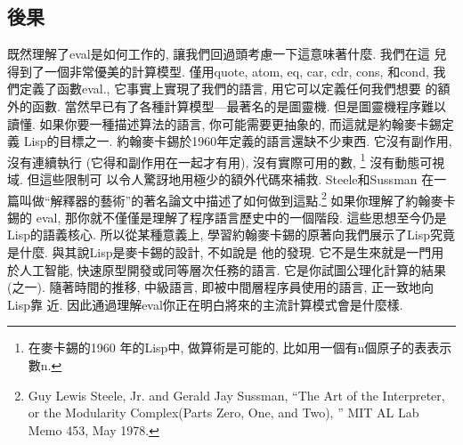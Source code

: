 \documentclass[12pt]{article}
\begin{document}
\begin{CJK}{UTF8}{bsmi}
\section{後果} 
既然理解了eval是如何工作的, 
讓我們回過頭考慮一下這意味著什麼. 
我們在這 
兒得到了一個非常優美的計算模型. 
僅用quote, atom, eq, car, cdr, cons, 和cond, 
我們定義了函數eval., 它事實上實現了我們的語言, 用它可以定義任何我們想要 
的額外的函數. 
當然早已有了各種計算模型---最著名的是圖靈機. 
但是圖靈機程序難以讀懂. 
如果你要一種描述算法的語言, 
你可能需要更抽象的, 
而這就是約翰麥卡錫定義 
Lisp的目標之一. 
約翰麥卡錫於1960年定義的語言還缺不少東西. 
它沒有副作用, 
沒有連續執行 
(它得和副作用在一起才有用), 
沒有實際可用的數, \footnote{在麥卡錫的1960 
年的Lisp中, 
做算術是可能的, 
比如用一個有n個原子的表表示數n.} 
沒有動態可視域. 
但這些限制可 
以令人驚訝地用極少的額外代碼來補救. 
Steele和Sussman
在一篇叫做``解釋器的藝術''的著名論文中描述了如何做到這點.\footnote{Guy 
Lewis Steele, Jr.  and Gerald Jay Sussman, ``The Art of the Interpreter, 
or the Modularity Complex(Parts Zero, One, and Two), '' 
MIT AL Lab Memo 453, May 1978.} 
如果你理解了約翰麥卡錫的 eval, 
那你就不僅僅是理解了程序語言歷史中的一個階段. 
這些思想至今仍是Lisp的語義核心. 
所以從某種意義上, 
學習約翰麥卡錫的原著向我們展示了Lisp究竟是什麼. 
與其說Lisp是麥卡錫的設計, 不如說是 
他的發現. 
它不是生來就是一門用於人工智能, 
快速原型開發或同等層次任務的語言. 
它是你試圖公理化計算的結果(之一). 
隨著時間的推移, 
中級語言, 
即被中間層程序員使用的語言, 
正一致地向Lisp靠 
近. 
因此通過理解eval你正在明白將來的主流計算模式會是什麼樣. 

\end{CJK}
\end{document}
